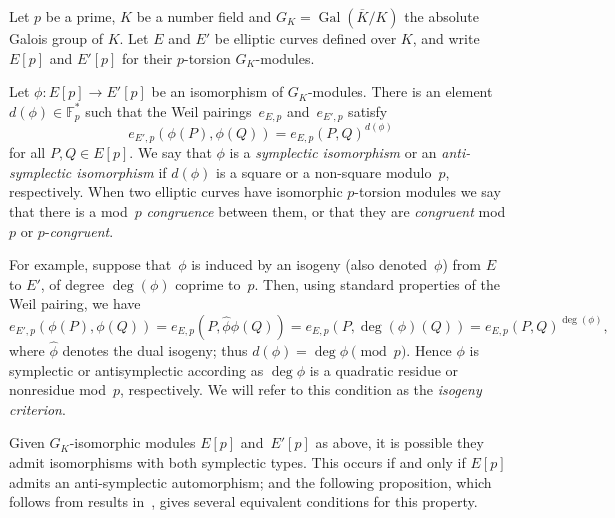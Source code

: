 \documentclass[12pt, reqno]{amsart}
\newcommand{\Fpstar}{\mathbb{F}_p^*}
\newcommand{\Kbar}{{\overline{K}}}
\DeclareMathOperator{\Gal}{Gal}
\numberwithin{equation}{section}
\theoremstyle{definition}
\theoremstyle{remark}
\begin{document}
Let $p$ be a prime, $K$ be a number field and $G_K = \Gal(\Kbar/K)$
the absolute Galois group of $K$.  Let $E$ and $E'$ be elliptic curves
defined over $K$, and write $E[p]$ and $E'[p]$ for their $p$-torsion
$G_K$-modules.

Let $\phi : E[p] \to E'[p]$ be an isomorphism of $G_K$-modules.  There
is an element $d(\phi) \in \Fpstar$ such that the Weil
pairings~$e_{E,p}$ and~$e_{E',p}$ satisfy
\[
e_{E',p}(\phi(P), \phi(Q)) = e_{E,p}(P, Q)^{d(\phi)}
\]
for all $P, Q \in E[p]$.  We say that $\phi$ is a {\em symplectic
  isomorphism} or an {\em anti-symplectic isomorphism} if $d(\phi)$ is
a square or a non-square modulo~$p$, respectively.  When two elliptic
curves have isomorphic $p$-torsion modules we say that there is a
mod~$p$ {\em congruence} between them, or that they are {\em
  congruent} mod~$p$ or $p$-{\em congruent}.

For example, suppose that~$\phi$ is induced by an isogeny (also
denoted~$\phi$) from $E$ to $E'$, of degree $\deg(\phi)$ coprime
to~$p$. Then, using standard properties of the Weil pairing,
we have
\[
  e_{E',p}(\phi(P), \phi(Q)) = e_{E,p}(P, \hat\phi\phi(Q)) =
  e_{E,p}(P, \deg(\phi)(Q)) = e_{E,p}(P, Q)^{\deg(\phi)},
  \]
  where $\hat{\phi}$ denotes the dual isogeny; 
  thus $d(\phi)=\deg\phi\pmod{p}$.
  Hence $\phi$ is symplectic or antisymplectic according as $\deg\phi$
is a quadratic residue or nonresidue mod~$p$, respectively.  We will refer to
this condition as the \emph{isogeny criterion}.

Given $G_K$-isomorphic modules $E[p]$ and~$E'[p]$ as above, it is
possible they admit isomorphisms with both symplectic types.  This
occurs if and only if $E[p]$ admits an anti-symplectic automorphism;
and the following proposition, which follows from results
in~\cite{FKSym}, gives several equivalent conditions for this property.
\end{document}
